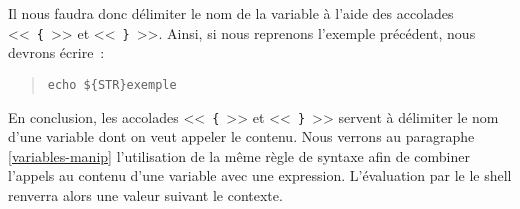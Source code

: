 Il nous faudra donc d\'{e}limiter le nom de la variable \`{a} l'aide des accolades <<~\verb={=~>> et
<<~\verb=}=~>>. Ainsi, si nous reprenons l'exemple pr\'{e}c\'{e}dent, nous devrons \'{e}crire~:
\begin{quote}
	\texttt{echo \$\{STR\}exemple}
\end{quote}

En conclusion, les accolades <<~\verb={=~>> et <<~\verb=}=~>> servent \`{a} d\'{e}limiter le nom d'une
variable dont on veut appeler le contenu. Nous verrons au paragraphe \ref{variables-manip} l'utilisation de
la m\^{e}me r\`{e}gle de syntaxe afin de combiner l'appels au contenu d'une variable avec une
expression. L'{\'e}valuation par le le shell {\Unix}
renverra alors une valeur suivant le contexte.

